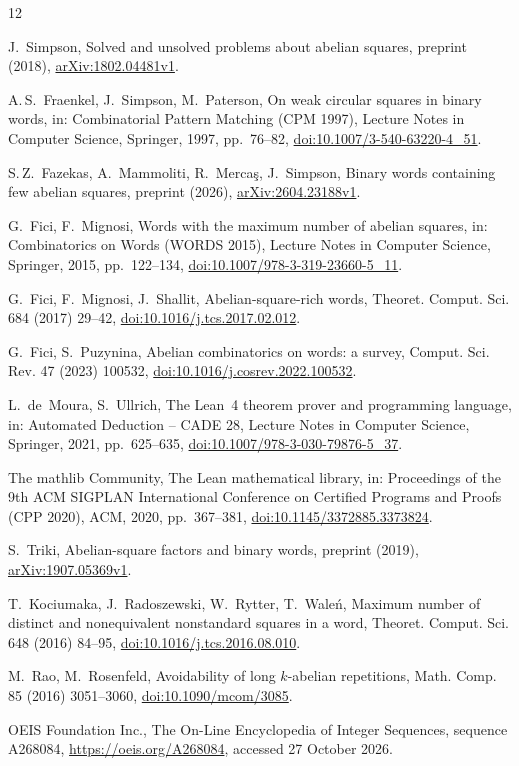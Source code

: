\documentclass[11pt,reqno]{amsart}
\theoremstyle{definition}
\begin{document}
\begin{thebibliography}{12}

J.~Simpson, Solved and unsolved problems about abelian squares, preprint (2018), \href{https://arxiv.org/abs/1802.04481v1}{arXiv:1802.04481v1}.

A.\,S.~Fraenkel, J.~Simpson, M.~Paterson, On weak circular squares in binary words, in: Combinatorial Pattern Matching (CPM 1997), Lecture Notes in Computer Science, Springer, 1997, pp.~76--82, \href{https://doi.org/10.1007/3-540-63220-4_51}{doi:10.1007/3-540-63220-4\_51}.

S.\,Z.~Fazekas, A.~Mammoliti, R.~Merca\c{s}, J.~Simpson, Binary words containing few abelian squares, preprint (2026), \href{https://arxiv.org/abs/2604.23188v1}{arXiv:2604.23188v1}.

G.~Fici, F.~Mignosi, Words with the maximum number of abelian squares, in: Combinatorics on Words (WORDS 2015), Lecture Notes in Computer Science, Springer, 2015, pp.~122--134, \href{https://doi.org/10.1007/978-3-319-23660-5_11}{doi:10.1007/978-3-319-23660-5\_11}.

G.~Fici, F.~Mignosi, J.~Shallit, Abelian-square-rich words, Theoret. Comput. Sci. 684 (2017) 29--42, \href{https://doi.org/10.1016/j.tcs.2017.02.012}{doi:10.1016/j.tcs.2017.02.012}.

G.~Fici, S.~Puzynina, Abelian combinatorics on words: a survey, Comput. Sci. Rev. 47 (2023) 100532, \href{https://doi.org/10.1016/j.cosrev.2022.100532}{doi:10.1016/j.cosrev.2022.100532}.

L.~de~Moura, S.~Ullrich, The Lean~4 theorem prover and programming language, in: Automated Deduction -- CADE 28, Lecture Notes in Computer Science, Springer, 2021, pp.~625--635, \href{https://doi.org/10.1007/978-3-030-79876-5_37}{doi:10.1007/978-3-030-79876-5\_37}.

The mathlib Community, The Lean mathematical library, in: Proceedings of the 9th ACM SIGPLAN International Conference on Certified Programs and Proofs (CPP 2020), ACM, 2020, pp.~367--381, \href{https://doi.org/10.1145/3372885.3373824}{doi:10.1145/3372885.3373824}.

S.~Triki, Abelian-square factors and binary words, preprint (2019), \href{https://arxiv.org/abs/1907.05369v1}{arXiv:1907.05369v1}.

T.~Kociumaka, J.~Radoszewski, W.~Rytter, T.~Wale\'n, Maximum number of distinct and nonequivalent nonstandard squares in a word, Theoret. Comput. Sci. 648 (2016) 84--95, \href{https://doi.org/10.1016/j.tcs.2016.08.010}{doi:10.1016/j.tcs.2016.08.010}.

M.~Rao, M.~Rosenfeld, Avoidability of long $k$-abelian repetitions, Math. Comp. 85 (2016) 3051--3060, \href{https://doi.org/10.1090/mcom/3085}{doi:10.1090/mcom/3085}.

OEIS Foundation Inc., The On-Line Encyclopedia of Integer Sequences, sequence A268084, \url{https://oeis.org/A268084}, accessed 27 October 2026.

\end{thebibliography}
\end{document}
